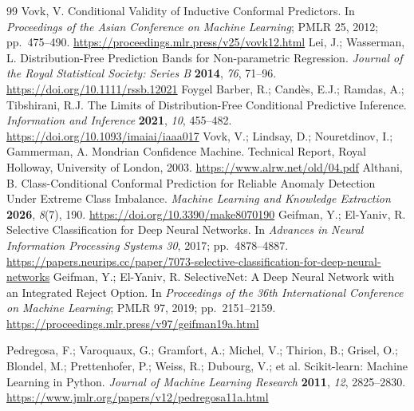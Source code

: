 \begin{thebibliography}{99}
Vovk, V.
Conditional Validity of Inductive Conformal Predictors.
In \emph{Proceedings of the Asian Conference on Machine Learning}; PMLR 25,
2012; pp.~475--490.
\url{https://proceedings.mlr.press/v25/vovk12.html}
Lei, J.; Wasserman, L.
Distribution-Free Prediction Bands for Non-parametric Regression.
\emph{Journal of the Royal Statistical Society: Series B} \textbf{2014},
\emph{76}, 71--96.
\url{https://doi.org/10.1111/rssb.12021}
Foygel Barber, R.; Cand\`es, E.J.; Ramdas, A.; Tibshirani, R.J.
The Limits of Distribution-Free Conditional Predictive Inference.
\emph{Information and Inference} \textbf{2021}, \emph{10}, 455--482.
\url{https://doi.org/10.1093/imaiai/iaaa017}
Vovk, V.; Lindsay, D.; Nouretdinov, I.; Gammerman, A.
Mondrian Confidence Machine.
Technical Report, Royal Holloway, University of London, 2003.
\url{https://www.alrw.net/old/04.pdf}
Althani, B.
Class-Conditional Conformal Prediction for Reliable Anomaly Detection
Under Extreme Class Imbalance.
\emph{Machine Learning and Knowledge Extraction} \textbf{2026}, \emph{8}(7), 190.
\url{https://doi.org/10.3390/make8070190}
Geifman, Y.; El-Yaniv, R.
Selective Classification for Deep Neural Networks.
In \emph{Advances in Neural Information Processing Systems 30}, 2017;
pp.~4878--4887.
\url{https://papers.neurips.cc/paper/7073-selective-classification-for-deep-neural-networks}
Geifman, Y.; El-Yaniv, R.
SelectiveNet: A Deep Neural Network with an Integrated Reject Option.
In \emph{Proceedings of the 36th International Conference on Machine
Learning}; PMLR 97, 2019; pp.~2151--2159.
\url{https://proceedings.mlr.press/v97/geifman19a.html}

Pedregosa, F.; Varoquaux, G.; Gramfort, A.; Michel, V.; Thirion, B.;
Grisel, O.; Blondel, M.; Prettenhofer, P.; Weiss, R.; Dubourg, V.; et al.
Scikit-learn: Machine Learning in Python.
\emph{Journal of Machine Learning Research} \textbf{2011}, \emph{12},
2825--2830.
\url{https://www.jmlr.org/papers/v12/pedregosa11a.html}
\end{thebibliography}



